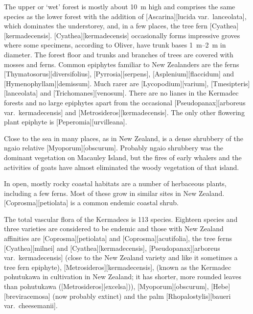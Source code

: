 The upper or `wet' forest is mostly about \SI{10}{\metre} high and comprises the same species as the lower forest with the addition of [Ascarina][lucida var.\ lanceolata], which dominates the understorey, and, in a few places, the tree fern [Cyathea][kermadecensis]. [Cyathea][kermadecensis] occasionally forms impressive groves where some specimens, according to Oliver, have trunk bases \SIrange{1}{2}{\metre} in diameter.
The forest floor and trunks and branches of trees are covered with mosses and ferns.
Common epiphytes familiar to New Zealanders are the ferns [Thymatosorus][diversifolius], [Pyrrosia][serpens], [Asplenium][flaccidum] and [Hymenophyllam][demissum].
Much rarer are [Lycopodium][varium], [Tmesipteris][lanceolata] and [Trichomanes][venosum].
There are no lianes in the Kermadec forests and no large epiphytes apart from the occasional [Pseudopanax][arboreus var.\ kermadecensis] and [Metrosideros][kermadecensis].
The only other flowering plant epiphyte is [Peperomia][urvilleana].

Close to the sea in many places, as in New Zealand, is a dense shrubbery of the ngaio relative [Myoporum][obscurum].
Probably ngaio shrubbery was the dominant vegetation on Macauley Island, but the fires of early whalers and the activities of goats have almost eliminated the woody vegetation of that island.

In open, mostly rocky coastal habitats are a number of herbaceous plants, including a few ferns.
Most of these grow in similar sites in New Zealand. [Coprosma][petiolata] is a common endemic coastal shrub.

The total vascular flora of the Kermadecs is 113 species.
Eighteen species and three varieties are considered to be endemic and those with New Zealand affinities are [Coprosma][petiolata] and [Coprosma][acutifolia], the tree ferns [Cyathea][milnei] and [Cyathea][kermadecensis],  [Pseudopanax][arboreus var.\ kermadecensis] (close to the New Zealand variety and like it sometimes a tree fern epiphyte), [Metrosideros][kermadecensis], (known as the Kermadec pohutukawa in cultivation in New Zealand; it has shorter, more rounded leaves than pohutukawa ([Metrosideros][excelsa])), [Myoporum][obscurum], [Hebe][breviracemosa] (now probably extinct) and the palm [Rhopalostylis][baueri var.\ cheesemanii].

